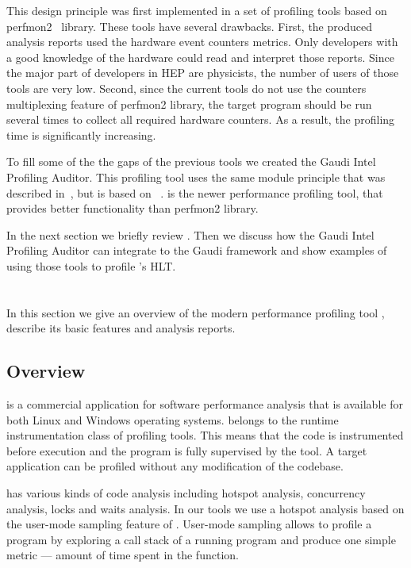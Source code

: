 This design principle was first implemented in a set of profiling tools based
on perfmon2~\cite{perfmon2} library. These tools have several drawbacks. First,
the produced analysis reports  used the  hardware event counters metrics. Only
developers with a good knowledge of the hardware could read and interpret those
reports. Since the major part of developers in HEP are physicists, the number
of users of those tools are very low. Second, since the current tools do not
use the counters multiplexing feature of perfmon2 library, the target program
should be run several times to collect all required hardware counters. As a
result, the profiling time is significantly increasing.

To fill some of the the gaps of the previous tools we created the Gaudi Intel
Profiling Auditor. This profiling tool uses the same module principle that was
described in~\cite{modular}, but is based on \iamp~\cite{vtune}.
\amp is the newer performance profiling tool, that provides better
functionality than perfmon2 library.

In the next section we briefly review \iamp. Then we discuss how the Gaudi
Intel Profiling Auditor can integrate \amp to the Gaudi framework and show
examples of using those tools to profile \lhcb's HLT.

\section[VTune Amplifier]{\iamp}
In this section we give an overview of the modern performance profiling tool
\iamp, describe its basic features and analysis reports.

\subsection{Overview}
\iamp is a commercial application for software performance analysis that is
available for both Linux and Windows operating systems. \amp belongs to the
runtime instrumentation class of profiling tools. This means that the code is
instrumented before execution and the program is fully supervised by the tool.
A target application can be profiled without any modification of the codebase.

\iamp has  various kinds of code analysis including hotspot analysis,
concurrency analysis, locks and waits analysis. In our tools we use a hotspot
analysis based on the user-mode  sampling feature of \amp. User-mode sampling
allows to profile a program by exploring a call stack of a running program and
produce one simple metric --- amount of time spent in the function.

